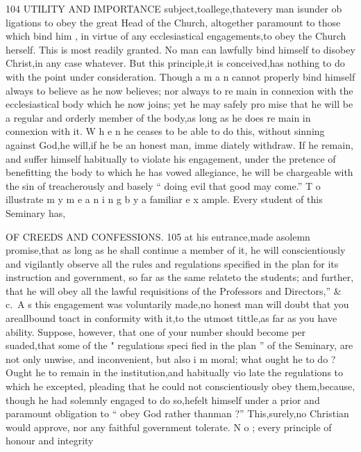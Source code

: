 \documentclass[
]{book}
\begin{document}
104 UTILITY AND IMPORTANCE
subject,toallege,thatevery man isunder ob ligations to obey the great Head of the Church, altogether paramount to those which bind him , in virtue of any ecclesiastical engagements,to
obey the Church herself. This is most readily granted. No man can lawfully bind himself
to disobey Christ,in any case whatever. But
this principle,it is conceived,has nothing to do with the point under consideration. Though a m a n cannot properly bind himself always to believe as he now believes; nor always to re main in connexion with the ecclesiastical body which he now joins; yet he may safely pro mise that he will be a regular and orderly
member of the body,as long as he does re main in connexion with it. W h e n he ceases
to be able to do this, without sinning against
God,he will,if he be an honest man, imme
diately withdraw. If he remain, and suffer himself habitually to violate his engagement,
under the pretence of benefitting the body to which he has vowed allegiance, he will be chargeable with the sin of treacherously and basely `` doing evil that good may come.''
T o illustrate m y m e a n i n g b y a familiar e x ample. Every student of this Seminary has,

OF CREEDS AND CONFESSIONS. 105
at his entrance,made asolemn promise,that as long as he shall continue a member of it, he will conscientiously and vigilantly observe all the rules and regulations specified in the plan for its instruction and government, so far as the same relateto the students; and further, that he will obey all the lawful requisitions of the Professors and Directors,'' \& c.~A s this
engagement was voluntarily made,no honest man will doubt that you areallbound toact
in conformity with it,to the utmost tittle,as far as you have ability. Suppose, however, that one of your number should become per suaded,that some of the " regulations speci fied in the plan '' of the Seminary, are not only unwise, and inconvenient, but also i m moral; what ought he to do ? Ought he to remain in the institution,and habitually vio late the regulations to which he excepted,
pleading that he could not conscientiously obey them,because, though he had solemnly engaged to do so,hefelt himself under a prior and paramount obligation to `` obey God rather thanman ?'' This,surely,no Christian would approve, nor any faithful government tolerate. N o ; every principle of honour and integrity
\end{document}
